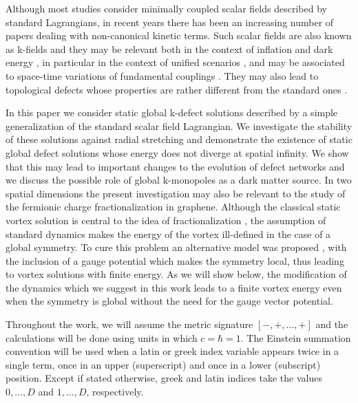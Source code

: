 \documentclass[prd,twocolumn,a4paper,superscriptaddress,floatfix]{revtex4}
\begin{document}
Although most studies consider minimally coupled scalar fields described by standard Lagrangians, in recent years there has been an increasing number of papers dealing with non-canonical kinetic terms. Such scalar fields are also known as k-fields and they may be relevant both in the context of inflation \cite{1999PhLB..458..209A} and dark energy \cite{2000PhRvL..85.4438A,Gorini:2003wa}, in particular in the context of unified scenarios \cite{Avelino:2008cu,Bose:2008ew}, and may be associated to space-time variations of fundamental couplings \cite{Avelino:2008dc}. They may also lead to topological defects whose properties are rather different from the standard ones \cite{Babichev:2006cy,Bazeia:2007df,Jin:2007fz,Adam:2007ij,Sarangi:2007mj,Babichev:2007tn,Adam:2008ck,Bazeia:2008tj,BlancoPillado:2008cp,Babichev:2008qv,Adam:2008rf,Liu:2009eh,Adam:2009px,Bazeia:2009db,Bazeia:2010vb,Bazeia:2010wr}. 

In this paper we consider static global k-defect solutions described by a simple generalization of the standard scalar field Lagrangian.
We investigate the stability of these solutions against radial stretching and demonstrate the existence of static global defect solutions whose energy does not diverge at spatial infinity. We show that this may lead to important changes to the evolution of defect networks and we discuss the possible role of global k-monopoles as a dark matter source. In two spatial dimensions the present investigation may also be relevant to the study of the fermionic charge fractionalization in graphene. Although the classical static vortex solution is central to the idea of fractionalization \cite{chamon}, the assumption of standard dynamics makes the energy of the vortex ill-defined in the case of a global symmetry. To cure this problem an alternative model was proposed  \cite{jackiw}, with the inclusion of a gauge potential which makes the symmetry local, thus leading to vortex solutions with finite energy. As we will show below, the modification of the dynamics which we suggest in this work leads to a finite vortex energy even when the symmetry is global without the need for the gauge vector potential.

Throughout the work, we will assume the metric signature $[-,+,...,+]$ and the calculations will be done using units in which $c=\hbar=1$. The Einstein summation convention will be used when a latin or greek index variable appears twice in a single term, once in an upper (superscript) and once in a lower (subscript) position. Except if stated otherwise, greek and latin indices take the values $0,...,D$ and $1,...,D$, respectively.
\end{document}
